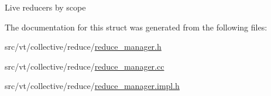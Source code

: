 Live reducers by scope 

The documentation for this struct was generated from the following files\+:\begin{DoxyCompactItemize}
\item 
src/vt/collective/reduce/\hyperlink{reduce__manager_8h}{reduce\+\_\+manager.\+h}\item 
src/vt/collective/reduce/\hyperlink{reduce__manager_8cc}{reduce\+\_\+manager.\+cc}\item 
src/vt/collective/reduce/\hyperlink{reduce__manager_8impl_8h}{reduce\+\_\+manager.\+impl.\+h}\end{DoxyCompactItemize}
